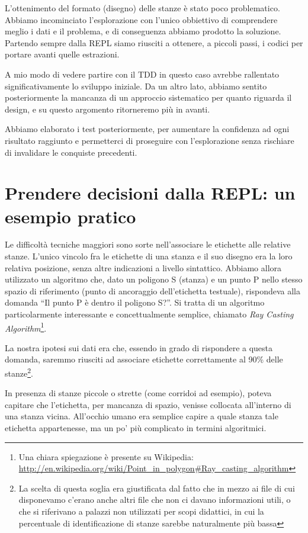 \documentclass[12pt]{report}
\begin{document}
L'ottenimento del formato (disegno) delle stanze è stato poco 
problematico. Abbiamo incominciato l'esplorazione 
con l'unico obbiettivo di comprendere meglio i dati e
il problema, e di conseguenza abbiamo prodotto la soluzione.
Partendo sempre dalla REPL siamo riusciti a 
ottenere, a piccoli passi, i codici per portare avanti quelle
estrazioni. 

A mio modo di vedere partire con il TDD in questo caso avrebbe 
rallentato significativamente lo sviluppo iniziale. Da un altro lato,
abbiamo sentito posteriormente la mancanza di un approccio sistematico 
per quanto riguarda il design, e su questo argomento ritorneremo più
in avanti.

Abbiamo elaborato i test posteriormente, per aumentare la confidenza 
ad ogni risultato raggiunto e permetterci di proseguire con 
l'esplorazione senza rischiare di invalidare le conquiste precedenti.

\section{Prendere decisioni dalla REPL: un esempio pratico}

Le difficoltà tecniche maggiori sono sorte nell'associare le etichette alle
relative stanze. L'unico vincolo fra le etichette di una stanza e il
suo disegno era la loro relativa posizione, senza altre indicazioni a
livello sintattico. Abbiamo allora utilizzato un algoritmo che, dato
un poligono S (stanza) e un punto P nello stesso spazio di riferimento
(punto di ancoraggio dell'etichetta testuale), rispondeva 
alla domanda ``Il punto P è dentro il poligono S?''.
Si tratta di un algoritmo particolarmente
interessante e concettualmente semplice, chiamato \textit{Ray Casting
Algorithm}\footnote{Una chiara spiegazione è presente su Wikipedia:
\url{http://en.wikipedia.org/wiki/Point_in_polygon\#Ray_casting_algorithm}}.

La nostra ipotesi sui dati era che, essendo in grado di rispondere a
questa domanda, saremmo riusciti ad associare etichette correttamente
al 90\% delle stanze\footnote{La scelta di questa soglia era
giustificata dal fatto che in mezzo ai file di cui disponevamo c'erano
anche altri file che non ci davano informazioni utili, o che si
riferivano a palazzi non utilizzati per scopi didattici, in cui la
percentuale di identificazione di stanze sarebbe naturalmente più bassa}.

In presenza di stanze piccole o strette (come corridoi ad esempio),
poteva capitare che l'etichetta, per mancanza di spazio, venisse
collocata all'interno di una stanza vicina. All'occhio umano era
semplice capire a quale stanza tale etichetta appartenesse, ma un po'
più complicato in termini algoritmici.
\end{document}
